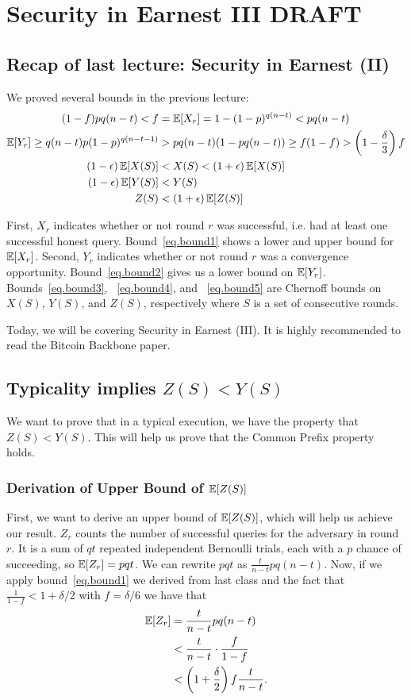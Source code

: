 \chapter{Security in Earnest III \small{\textsf{DRAFT}}}\label{chapter.earnest3}

\section{Recap of last lecture: Security in Earnest (II)}
We proved several bounds in the previous lecture:
\begin{align}
(1-f)pq(n-t) < f &= \operatorname{\mathbb{E}}[X_r] = 1 - (1-p)^{q(n-t)} < pq(n-t)\label{eq.bound1}\\
\operatorname{\mathbb{E}}[Y_r] \geq q(n-t)p(1-p)^{q(n-t-1)} &> pq(n-t)(1-pq(n-t)) \geq f(1-f) > \left(1-\frac{\delta}{3}\right)f \label{eq.bound2}\\
(1-\epsilon)\operatorname{\mathbb{E}}[X(S)] &< X(S) < (1+\epsilon)\operatorname{\mathbb{E}}[X(S)]\label{eq.bound3}\\
 (1-\epsilon)\operatorname{\mathbb{E}}[Y(S)] &< Y(S)\label{eq.bound4}\\
Z(S) &< (1+\epsilon)\operatorname{\mathbb{E}}[Z(S)]\label{eq.bound5}
\end{align}

 First, $X_r$ indicates whether or not round $r$ was successful, i.e. had at least one successful honest query. Bound~\ref{eq.bound1} shows a lower and upper bound for $\mathbb{E}[X_r]$.
 Second, $Y_r$ indicates whether or not round $r$ was a convergence opportunity. Bound~\ref{eq.bound2} gives us a lower bound on $\mathbb{E}[Y_r]$. Bounds~\ref{eq.bound3}, ~\ref{eq.bound4}, and ~\ref{eq.bound5} are Chernoff bounds on $X(S)$, $Y(S)$, and $Z(S)$, respectively where $S$ is a set of consecutive rounds.

 Today, we will be covering Security in Earnest (III). It is highly recommended to read the Bitcoin Backbone paper.

\section{Typicality implies $Z(S) < Y(S)$}
We want to prove that in a typical execution, we have the property that $Z(S) < Y(S)$. This will help us prove that the Common Prefix property holds.

\subsection{Derivation of Upper Bound of $\mathbb{E}[Z(S)]$}
First, we want to derive an upper bound of $\mathbb{E}[Z(S)]$, which will help us achieve our result.
$Z_r$ counts the number of successful queries for the adversary in round $r$. It is a sum of $qt$ repeated independent Bernoulli trials, each with a $p$ chance of succeeding, so $\operatorname{\mathbb{E}}[Z_r] = pqt$. We can rewrite $pqt$ as $\frac{t}{n-t} pq(n-t)$. Now, if we apply bound~\ref{eq.bound1} we derived from last class and the fact that $\frac{1}{1-f} < 1 + \delta/2$ with $f = \delta/6$ we have that
\begin{align}\operatorname{\mathbb{E}}[Z_r] &= \frac{t}{n-t} pq(n-t) \\
&< \frac{t}{n-t} \cdot \frac{f}{1-f}\\
&< \left(1 + \frac{\delta}{2}\right)f \frac{t}{n-t}.\label{eq.zexpupper}
\end{align}

